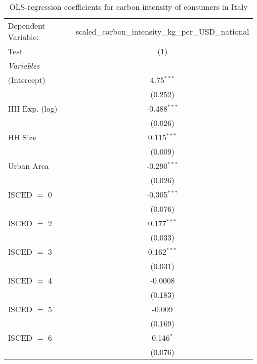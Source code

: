 
\begin{table}[htbp!]
   \centering
   \small
   \begin{adjustbox}{width = 1\textwidth, max height = 0.95\textheight, center}
      \begin{threeparttable}[b]
         \caption{\label{tab:OLS_1_ITA} OLS-regression coefficients for carbon intensity of consumers in Italy}
         \begin{tabular}{lc}
            \tabularnewline \midrule \midrule
            Dependent Variable: & scaled\_carbon\_intensity\_kg\_per\_USD\_national\\        
            Test                & (1)\\  
            \midrule
            \emph{Variables}\\
            (Intercept)         & 4.75$^{***}$\\   
                                & (0.252)\\   
            HH Exp. (log)       & -0.488$^{***}$\\   
                                & (0.026)\\   
            HH Size             & 0.115$^{***}$\\   
                                & (0.009)\\   
            Urban Area          & -0.290$^{***}$\\   
                                & (0.026)\\   
            ISCED $=$ 0         & -0.305$^{***}$\\   
                                & (0.076)\\   
            ISCED $=$ 2         & 0.177$^{***}$\\   
                                & (0.033)\\   
            ISCED $=$ 3         & 0.162$^{***}$\\   
                                & (0.031)\\   
            ISCED $=$ 4         & -0.0008\\   
                                & (0.183)\\   
            ISCED $=$ 5         & -0.009\\   
                                & (0.169)\\   
            ISCED $=$ 6         & 0.146$^{*}$\\   
                                & (0.076)\\   

\end{tabular}
\end{threeparttable}
\end{adjustbox}
\end{table}
